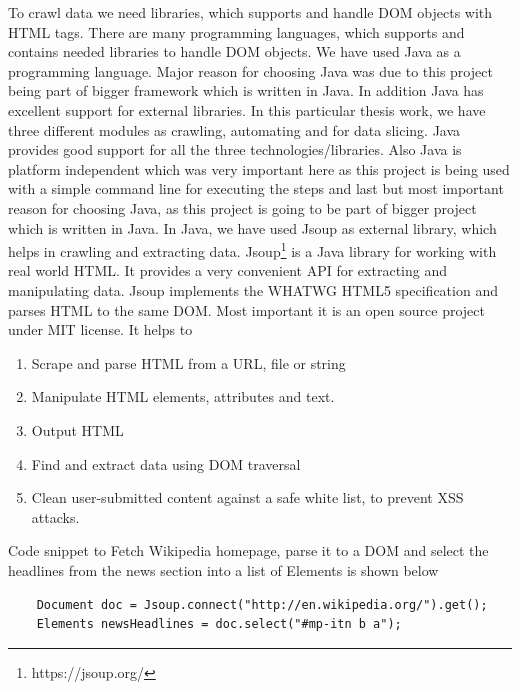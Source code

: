 \documentclass[article,type=msc,colorback,accentcolor=tud9c,twoside,11pt]{tudthesis}
\begin{document}
	To crawl data we need libraries, which supports and handle DOM objects with HTML tags. There are many programming languages, which supports and contains needed libraries to handle DOM objects. We have used Java as a programming language. Major reason for choosing Java was due to this project being part of bigger framework which is written in Java. In addition Java has excellent support for external libraries. In this particular thesis work, we have three different modules as crawling, automating and for data slicing. Java provides good support for all the three technologies/libraries. Also Java is platform independent which was very important here as this project is being used with a simple command line for executing the steps and last but most important reason for choosing Java, as this project is going to be part of bigger project which is written in Java. In Java, we have used Jsoup as external library, which helps in crawling and extracting data. Jsoup\footnote{https://jsoup.org/} is a Java library for working with real world HTML. It provides a very convenient API for extracting and manipulating data. Jsoup implements the WHATWG HTML5 specification and parses HTML to the same DOM. Most important it is an open source project under MIT license. It helps to
	\begin{enumerate}
		\item Scrape and parse HTML from a URL, file or string
		\item Manipulate HTML elements, attributes and text.
		\item Output HTML
		\item Find and extract data using DOM traversal
		\item Clean user-submitted content against a safe white list, to prevent XSS attacks.
	\end{enumerate}
	Code snippet to Fetch Wikipedia homepage, parse it to a DOM and select the headlines from the news section into a list of Elements is shown below
	
	\begin{lstlisting}
	Document doc = Jsoup.connect("http://en.wikipedia.org/").get();
	Elements newsHeadlines = doc.select("#mp-itn b a");
	\end{lstlisting}
	
\end{document}
